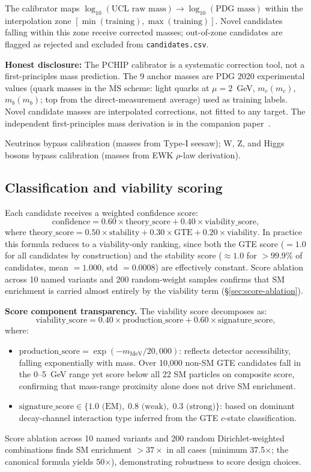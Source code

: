 \documentclass[12pt]{article}
\numberwithin{equation}{section}
\begin{document}
The calibrator maps $\log_{10}(\text{UCL raw mass}) \to \log_{10}(\text{PDG mass})$ within the interpolation zone $[\min(\text{training}), \max(\text{training})]$. Novel candidates falling within this zone receive corrected masses; out-of-zone candidates are flagged as rejected and excluded from \texttt{candidates.csv}.

\textbf{Honest disclosure:} The PCHIP calibrator is a systematic correction tool, not a first-principles mass prediction. The 9 anchor masses are PDG 2020 experimental values (quark masses in the $\overline{\mathrm{MS}}$ scheme: light quarks at $\mu = 2$~GeV, $m_c(m_c)$, $m_b(m_b)$; top from the direct-measurement average) used as training labels. Novel candidate masses are interpolated corrections, not fitted to any target. The independent first-principles mass derivation is in the companion paper~\cite{SpivackSM}.

Neutrinos bypass calibration (masses from Type-I seesaw); W, Z, and Higgs bosons bypass calibration (masses from EWK $\rho$-law derivation).

\subsection{Classification and viability scoring}
\label{sec:classification}

Each candidate receives a weighted confidence score:
\[
\text{confidence} = 0.60 \times \text{theory\_score} + 0.40 \times \text{viability\_score},
\]
where $\text{theory\_score} = 0.50 \times \text{stability} + 0.30 \times \text{GTE} + 0.20 \times \text{viability}$. In practice this formula reduces to a viability-only ranking, since both the GTE score ($= 1.0$ for all candidates by construction) and the stability score ($\approx 1.0$ for $> 99.9\%$ of candidates, mean $= 1.000$, std $= 0.0008$) are effectively constant. Score ablation across 10 named variants and 200 random-weight samples confirms that SM enrichment is carried almost entirely by the viability term (\S\ref{sec:score-ablation}).

\textbf{Score component transparency.} The viability score decomposes as:
\[
\text{viability\_score} = 0.40 \times \text{production\_score} + 0.60 \times \text{signature\_score},
\]
where:
\begin{itemize}[nosep]
\item $\text{production\_score} = \exp(-m_{\text{MeV}}/20{,}000)$: reflects detector accessibility, falling exponentially with mass. Over 10,000 non-SM GTE candidates fall in the 0--5~GeV range yet score below all 22 SM particles on composite score, confirming that mass-range proximity alone does not drive SM enrichment.
\item $\text{signature\_score} \in \{1.0 \text{ (EM)},\; 0.8 \text{ (weak)},\; 0.3 \text{ (strong)}\}$: based on dominant decay-channel interaction type inferred from the GTE $c$-state classification.
\end{itemize}
Score ablation across 10 named variants and 200 random Dirichlet-weighted combinations finds SM enrichment $> 37\times$ in all cases (minimum 37.5$\times$; the canonical formula yields 50$\times$), demonstrating robustness to score design choices.
\end{document}
